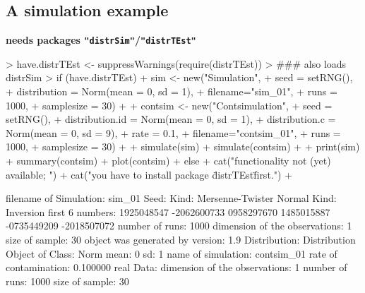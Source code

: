 \documentclass[11pt]{article}
\newcommand{\pkg}[1]{{\tt "#1"}}
\begin{document}
\subsection{A simulation example}\label{simex}
{\bf needs packages \pkg{distrSim}/\pkg{distrTEst}}\\[2ex]
\begin{Schunk}
\begin{Sinput}
> have.distrTEst <- suppressWarnings(require(distrTEst))
>     ### also loads distrSim
> if (have.distrTEst)
+    { sim <- new("Simulation",
+                 seed = setRNG(),
+                 distribution = Norm(mean = 0, sd = 1),
+                 filename="sim_01",
+                 runs = 1000,
+                 samplesize = 30)
+
+      contsim <- new("Contsimulation",
+                     seed = setRNG(),
+                     distribution.id = Norm(mean = 0, sd = 1),
+                     distribution.c = Norm(mean = 0, sd = 9),
+                     rate = 0.1,
+                     filename="contsim_01",
+                     runs = 1000,
+                     samplesize = 30)
+
+      simulate(sim)
+      simulate(contsim)
+
+      print(sim)
+      summary(contsim)
+      plot(contsim)
+    } else {
+     cat("\n functionality not (yet) available; ")
+     cat("you have to install package \"distrTEst\" first.\n")
+    }
\end{Sinput}
\begin{Soutput}
filename of Simulation: sim_01
Seed:  Kind: Mersenne-Twister
       Normal Kind: Inversion
       first 6 numbers:  1925048547	-2062600733	 0958297670
                         1485015887	-0735449209	-2018507072
number of runs: 1000
dimension of the observations: 1
size of sample: 30
object was generated by version: 1.9
Distribution:
Distribution Object of Class: Norm
 mean: 0
 sd: 1
name of simulation: contsim_01
rate of contamination: 0.100000
real Data:
dimension of the observations: 1
number of runs: 1000
size of sample: 30
\end{Soutput}
\end{Schunk}
\end{document}
